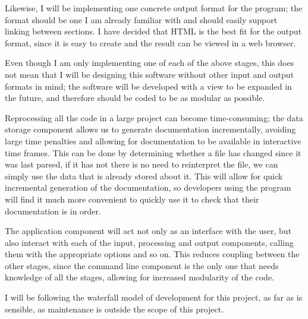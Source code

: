 Likewise, I will be implementing one concrete output format for the program; the
format should be one I am already familiar with and should easily support
linking between sections. I have decided that HTML is the best fit for the
output format, since it is easy to create and the result can be viewed in a
web browser.

Even though I am only implementing one of each of the above stages, this does
not mean that I will be designing this software without other input and output
formats in mind; the software will be developed with a view to be expanded in
the future, and therefore should be coded to be as modular as possible.

Reprocessing all the code in a large project can become time-consuming; the data
storage component allows us to generate documentation incrementally, avoiding
large time penalties and allowing for documentation to be available in
interactive time frames. This can be done by determining whether a file has
changed since it was last parsed, if it has not there is no need to reinterpret
the file, we can simply use the data that is already stored about it. This will
allow for quick incremental generation of the documentation, so developers using
the program will find it much more convenient to quickly use it to check that
their documentation is in order.

The application component will act not only as an interface with the user, but
also interact with each of the input, processing and output components, calling
them with the appropriate options and so on. This reduces coupling between the
other stages, since the command line component is the only one that needs
knowledge of all the stages, allowing for increased modularity of the code.

I will be following the waterfall model of development for this project, as far
as is sensible, as maintenance is outside the scope of this project.

\begin{center}
  \vspace*{5mm}
\end{center}

